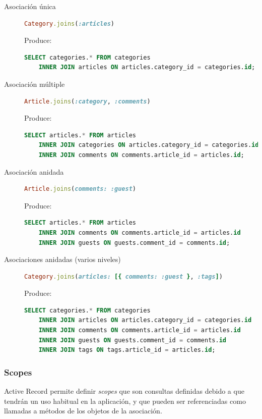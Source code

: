 \begin{description}
	\item[Asociación única]
	\begin{lstlisting}[language=Ruby]
	Category.joins(:articles)
	\end{lstlisting}
	Produce:
	\begin{lstlisting}[language=SQL]
	SELECT categories.* FROM categories 
	INNER JOIN articles ON articles.category_id = categories.id;
	\end{lstlisting}
	
	\item[Asociación múltiple]
	\begin{lstlisting}[language=Ruby]
	Article.joins(:category, :comments)
	\end{lstlisting}
	Produce:
	\begin{lstlisting}[language=SQL]
	SELECT articles.* FROM articles
	INNER JOIN categories ON articles.category_id = categories.id
    INNER JOIN comments ON comments.article_id = articles.id;
	\end{lstlisting}
	
	\item[Asociación anidada]
	\begin{lstlisting}[language=Ruby]
	Article.joins(comments: :guest)
	\end{lstlisting}
	Produce:
	\begin{lstlisting}[language=SQL]
	SELECT articles.* FROM articles
  	INNER JOIN comments ON comments.article_id = articles.id
 	INNER JOIN guests ON guests.comment_id = comments.id;
	\end{lstlisting}
	
	\item[Asociaciones anidadas (varios niveles)]
	\begin{lstlisting}[language=Ruby]
	Category.joins(articles: [{ comments: :guest }, :tags])
	\end{lstlisting}
	Produce:
	\begin{lstlisting}[language=SQL]
	SELECT categories.* FROM categories
  	INNER JOIN articles ON articles.category_id = categories.id
  	INNER JOIN comments ON comments.article_id = articles.id
  	INNER JOIN guests ON guests.comment_id = comments.id
  	INNER JOIN tags ON tags.article_id = articles.id;
	\end{lstlisting}
\end{description}


\subsubsection{Scopes}
Active Record permite definir \textit{scopes} que son consultas definidas debido a que tendrán un uso habitual en la aplicación, y que pueden ser referenciadas como llamadas a métodos de los objetos de la asociación.

